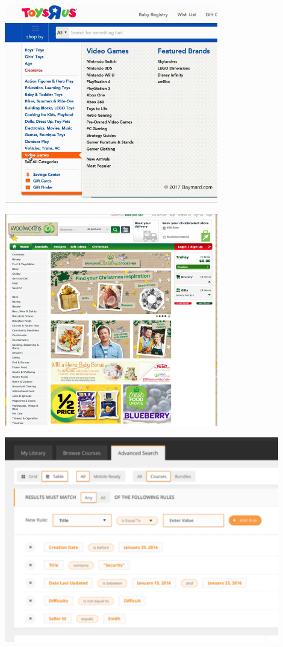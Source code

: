 \documentclass[]{article}
\begin{document}
\begin{center}
\includegraphics[width=0.7\textwidth]{images/image17.png}
\end{center}



\begin{center}
\includegraphics[width=0.7\textwidth]{images/image18.png}
\end{center}







\begin{center}
\includegraphics[width=0.9\textwidth]{images/image20.png}
\end{center}
\end{document}
